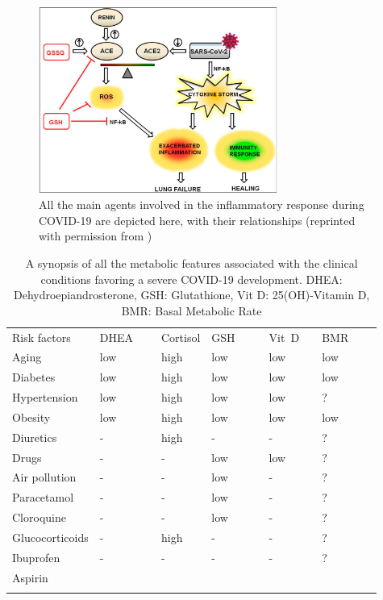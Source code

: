 \documentclass[graybox]{svmult}
\begin{document}
\begin{figure}[t]
\center
\includegraphics[width=0.7\textwidth]{ace.png}
\caption{All the main agents involved in the inflammatory response during COVID-19 are depicted here, with their relationships (reprinted with permission from \cite{Silvagno_2020})}
\label{ace}
\end{figure}

\begin{table}[t]
\center
\begin{tabular}{llllll}
\hline\noalign{\smallskip}
Risk factors~~~ & DHEA~~~ &	Cortisol & GSH~~~~ & Vit~D~~ & BMR~~~~ \\
\noalign{\smallskip}\svhline\noalign{\smallskip}
Aging & low & high & low & low & low \\
Diabetes & low & high & low & low & low \\
Hypertension & low & high & low & low & ? \\
Obesity & low & high & low & low & low \\
Diuretics & - & high & - & - & ? \\
Drugs & - & - & low & low & ? \\
Air pollution & - & - & low & - & ? \\
Paracetamol & - & - & low & - & ? \\
Cloroquine & - & - & low & - & ? \\
Glucocorticoids & - & high & - & - & ? \\
Ibuprofen & - & - & - & - & ? \\
Aspirin	\\
\hline\noalign{\smallskip}
\end{tabular}
\caption{A synopsis of all the metabolic features associated with the clinical conditions favoring a severe COVID-19 development. DHEA: Dehydroepiandrosterone, GSH: Glutathione, Vit D: 25(OH)-Vitamin D, BMR: Basal Metabolic Rate}
\label{riskFactors}
\end{table}
\end{document}
